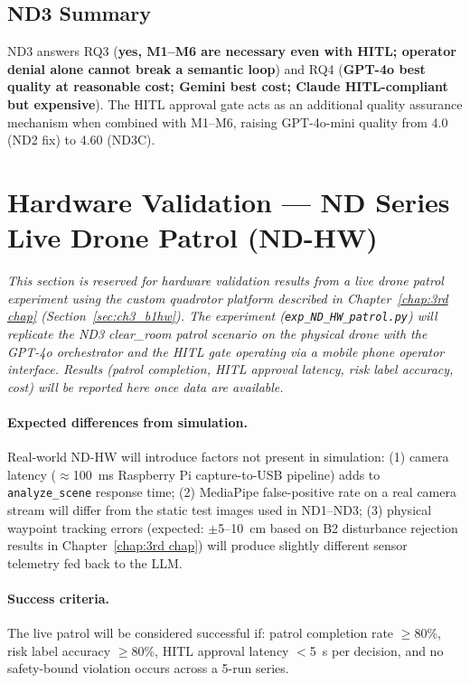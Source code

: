 \subsection{ND3 Summary}
\label{sec:ch4_nd3_summary}

ND3 answers RQ3 (\textbf{yes, M1--M6 are necessary even with HITL; operator denial alone
cannot break a semantic loop}) and RQ4 (\textbf{GPT-4o best quality at reasonable cost;
Gemini best cost; Claude HITL-compliant but expensive}).  The HITL approval gate acts as an
additional quality assurance mechanism when combined with M1--M6, raising GPT-4o-mini
quality from 4.0 (ND2 fix) to 4.60 (ND3C).

\section{Hardware Validation --- ND Series Live Drone Patrol (ND-HW)}
\label{sec:ch4_ndhw}

\textit{This section is reserved for hardware validation results from a live drone patrol
experiment using the custom quadrotor platform described in Chapter~\ref{chap:3rd chap}
(Section~\ref{sec:ch3_b1hw}).  The experiment (\texttt{exp\_ND\_HW\_patrol.py}) will
replicate the ND3 clear\_room patrol scenario on the physical drone with the GPT-4o
orchestrator and the HITL gate operating via a mobile phone operator interface.
Results (patrol completion, HITL approval latency, risk label accuracy, cost) will be
reported here once data are available.}

\paragraph{Expected differences from simulation.}
Real-world ND-HW will introduce factors not present in simulation: (1) camera latency
($\approx$100~ms Raspberry Pi capture-to-USB pipeline) adds to \texttt{analyze\_scene}
response time; (2) MediaPipe false-positive rate on a real camera stream will differ from
the static test images used in ND1--ND3; (3) physical waypoint tracking errors
(expected: $\pm$5--10~cm based on B2 disturbance rejection results in
Chapter~\ref{chap:3rd chap}) will produce slightly different sensor telemetry fed back to
the LLM.

\paragraph{Success criteria.}
The live patrol will be considered successful if: patrol completion rate $\geq$80\%,
risk label accuracy $\geq$80\%, HITL approval latency $<$5~s per decision, and no
safety-bound violation occurs across a 5-run series.

